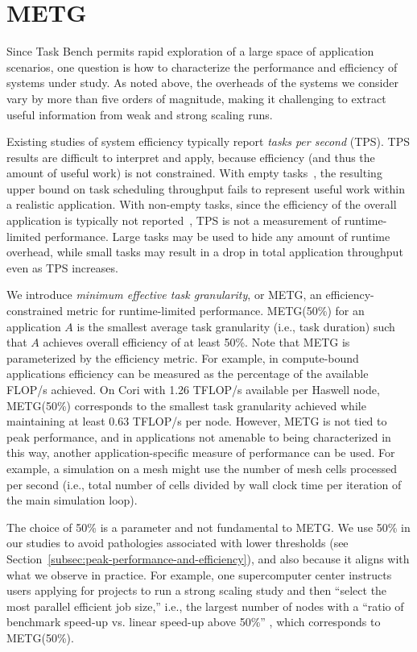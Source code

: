 \section{METG}
\label{sec:metg}




Since Task Bench permits rapid exploration of a large space
of application scenarios, one question is how to characterize the
performance and efficiency of systems under study. As noted
above, the overheads of the systems we consider vary by more than
five orders of magnitude, making it challenging to extract useful
information from weak and strong scaling runs.

Existing studies of system efficiency
typically report \emph{tasks per second} (TPS). TPS results
are difficult to interpret and apply, because efficiency (and thus
the amount of useful work) is not constrained. With empty
tasks~\cite{LegionTracing18}, the resulting upper bound on task
scheduling throughput fails to represent useful work within a
realistic application. With non-empty tasks, since the efficiency of
the overall application is typically not reported~\cite{Canary16,
  Armstrong14}, TPS is not a measurement of runtime-limited
performance. Large tasks may be used to hide any amount of runtime
overhead, while small tasks may result in a drop in total application
throughput even as TPS increases.

We introduce \emph{minimum effective task granularity}, or METG, an
efficiency-constrained metric for runtime-limited
performance. METG(50\%) for an application $A$ is
the smallest average task granularity (i.e., task duration) such that $A$
achieves overall efficiency of at least 50\%. Note that METG is parameterized by the efficiency metric. For example, in
compute-bound applications efficiency can be measured as the
percentage of the available FLOP/s achieved. On Cori with 1.26 TFLOP/s available per Haswell node, METG(50\%) corresponds to
the smallest task granularity achieved while maintaining at least 0.63
TFLOP/s per node. However, METG is not tied to peak performance, and
in applications not amenable to being characterized in this way,
another application-specific measure of performance can be used. For
example, a simulation on a mesh might use the number of mesh cells
processed per second (i.e., total number of cells divided by wall
clock time per iteration of the main simulation loop).

The choice of 50\% is a parameter and not fundamental to METG. We use
50\% in our studies to avoid pathologies associated with lower
thresholds (see Section~\ref{subsec:peak-performance-and-efficiency}),
and also because it aligns with what we observe in practice. For
example, one supercomputer center instructs users applying for
projects to run a strong scaling study and then ``select the most
parallel efficient job size,'' i.e., the largest number of nodes with
a ``ratio of benchmark speed-up vs. linear speed-up above 50\%''
\cite{CSCSReport}, which corresponds to METG(50\%).

